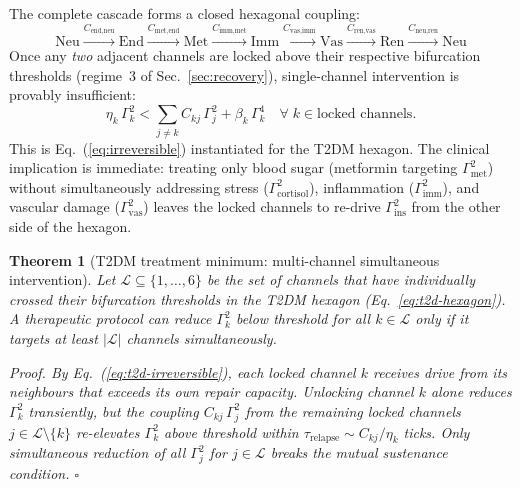 \documentclass[aps,pre,twocolumn,superscriptaddress,floatfix]{revtex4-2}
\newtheorem{theorem}{Theorem}
\begin{document}
The complete cascade forms a closed hexagonal
coupling:
\begin{equation}
  \text{Neu}\!\xrightarrow{C_{\text{end,neu}}}
  \!\text{End}\!\xrightarrow{C_{\text{met,end}}}
  \!\text{Met}\!\xrightarrow{C_{\text{imm,met}}}
  \!\text{Imm}\!\xrightarrow{C_{\text{vas,imm}}}
  \!\text{Vas}\!\xrightarrow{C_{\text{ren,vas}}}
  \!\text{Ren}\!\xrightarrow{C_{\text{neu,ren}}}
  \!\text{Neu}
  \label{eq:t2d-hexagon}
\end{equation}
Once any \emph{two} adjacent channels are locked
above their respective bifurcation thresholds
(regime~3 of Sec.~\ref{sec:recovery}),
single-channel intervention is provably
insufficient:
\begin{equation}
  \eta_k\,\Gamma_k^2
  < \sum_{j \neq k} C_{kj}\,\Gamma_j^2
    + \beta_k\,\Gamma_k^4
  \quad \forall\; k \in \text{locked channels.}
  \label{eq:t2d-irreversible}
\end{equation}
This is Eq.~(\ref{eq:irreversible}) instantiated
for the T2DM hexagon.
The clinical implication is immediate: treating
only blood sugar (metformin targeting
$\Gamma_{\text{met}}^2$) without simultaneously
addressing stress ($\Gamma_{\text{cortisol}}^2$),
inflammation ($\Gamma_{\text{imm}}^2$), and
vascular damage ($\Gamma_{\text{vas}}^2$)
leaves the locked channels to re-drive
$\Gamma_{\text{ins}}^2$ from the other side
of the hexagon.

\begin{theorem}[T2DM treatment minimum:
  multi-channel simultaneous intervention]
\label{thm:t2d-treatment}
Let $\mathcal{L} \subseteq \{1,\ldots,6\}$
be the set of channels that have individually
crossed their bifurcation thresholds in the
T2DM hexagon (Eq.~\ref{eq:t2d-hexagon}).
A therapeutic protocol can reduce
$\Gamma_k^2$ below threshold for all
$k \in \mathcal{L}$ only if it targets at
least $|\mathcal{L}|$ channels simultaneously.

\emph{Proof.}\;
By Eq.~(\ref{eq:t2d-irreversible}), each locked
channel $k$ receives drive from its neighbours
that exceeds its own repair capacity.
Unlocking channel $k$ alone reduces
$\Gamma_k^2$ transiently, but the coupling
$C_{kj}\,\Gamma_j^2$ from the remaining locked
channels $j \in \mathcal{L} \setminus \{k\}$
re-elevates $\Gamma_k^2$ above threshold within
$\tau_{\text{relapse}} \sim C_{kj}/\eta_k$ ticks.
Only simultaneous reduction of all
$\Gamma_j^2$ for $j \in \mathcal{L}$ breaks
the mutual sustenance condition.
$\square$
\end{theorem}
\end{document}
